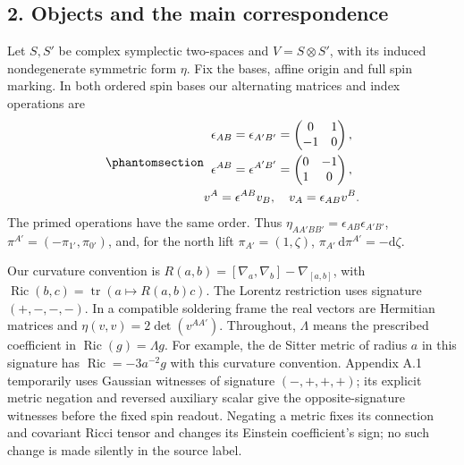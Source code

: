 \documentclass[
  english,
  11pt,
  reqno]{amsart}
\begin{document}
\protect{}\label{sec:gg-objects}

\subsection{2. Objects and the main
correspondence}\label{objects-and-the-main-correspondence}

Let \(S,S'\) be complex symplectic two-spaces and \(V=S\otimes S'\),
with its induced nondegenerate symmetric form \(\eta\). Fix the bases,
affine origin and full spin marking. In both ordered spin bases our
alternating matrices and index operations are
\begin{equation}\protect\phantomsection\label{eq:gg-spin-index-convention}{\begin{gathered}
\epsilon_{AB}=\epsilon_{A'B'}=
       \begin{pmatrix}0&1\\-1&0\end{pmatrix}, \\
\epsilon^{AB}=\epsilon^{A'B'}=
       \begin{pmatrix}0&-1\\1&0\end{pmatrix}, \\
v^A=\epsilon^{AB}v_B,\quad v_A=\epsilon_{AB}v^B .
\end{gathered}}\end{equation} The primed operations have the same order. Thus
\(\eta_{AA'BB'}=\epsilon_{AB}\epsilon_{A'B'}\),
\(\pi^{A'}=(-\pi_{1'},\pi_{0'})\), and, for the north lift
\(\pi_{A'}=(1,\zeta)\), \(\pi_{A'}\,\mathrm d\pi^{A'}=-\mathrm d\zeta\).

\protect{}\label{sec:gg-curvature-signature-conventions}

Our curvature convention is
\(R(a,b)=[\nabla_a,\nabla_b]-\nabla_{[a,b]}\), with
\(\operatorname{Ric}(b,c)=\operatorname{tr}(a\mapsto R(a,b)c)\). The
Lorentz restriction uses signature \((+,-,-,-)\). In a compatible
soldering frame the real vectors are Hermitian matrices and
\(\eta(v,v)=2\det(v^{AA'})\). Throughout, \(\Lambda\) means the
prescribed coefficient in \(\operatorname{Ric}(g)=\Lambda g\). For
example, the de Sitter metric of radius \(a\) in this signature has
\(\operatorname{Ric}=-3a^{-2}g\) with this curvature convention.
Appendix A.1 temporarily uses Gaussian witnesses of signature
\((-,+,+,+)\); its explicit metric negation and reversed auxiliary
scalar give the opposite-signature witnesses before the fixed spin
readout. Negating a metric fixes its connection and covariant Ricci
tensor and changes its Einstein coefficient's sign; no such change is
made silently in the source label.
\end{document}
